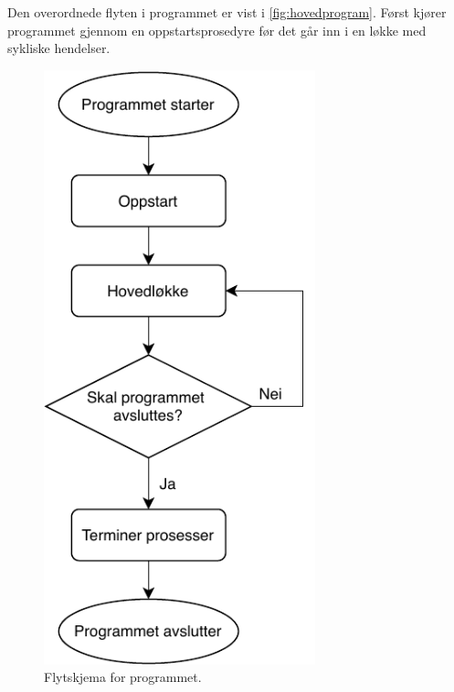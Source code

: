 Den overordnede flyten i programmet er vist i \autoref{fig:hovedprogram}. 
Først kjører programmet gjennom en oppstartsprosedyre før det går inn i en løkke med sykliske hendelser.

\begin{figure}[!htbp]
\begin{minipage}[b]{0.3\textwidth}
    \centering
    \includegraphics[width=0.7\textwidth]{implementering/Program/hovedprogram.pdf}
    \caption{Flytskjema for programmet.}
    \label{fig:hovedprogram}
\end{minipage}
\hfill
\begin{minipage}[b]{0.3\textwidth}
    \centering

\end{minipage}
\end{figure}
